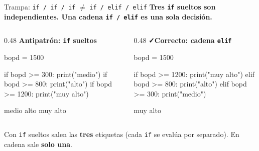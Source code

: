 \documentclass[aspectratio=169, 11pt]{beamer}
\begin{document}
\begin{frame}[fragile,shrink=12]{Trampa: \texttt{if / if / if} \(\neq\) \texttt{if / elif / elif}}
  \vspace{-4pt}
  {\small\color{arcaDark}\bfseries
    Tres \texttt{if} sueltos son \textbf{independientes}. Una cadena \texttt{if / elif} es \textbf{una sola} decisión.}

  \vspace{4pt}
  \begin{columns}[T]
    \begin{column}{0.48\textwidth}
      {\scriptsize\color{arcaRed}\bfseries\faTimes\hspace{3pt}Antipatrón: \texttt{if} sueltos}
      \begin{pyblock}
bopd = 1500

if bopd >= 300:
    print("medio")
if bopd >= 800:
    print("alto")
if bopd >= 1200:
    print("muy alto")
      \end{pyblock}
      \vspace{2pt}
      \begin{outputblock}
medio
alto
muy alto
      \end{outputblock}
    \end{column}

    \begin{column}{0.48\textwidth}
      {\scriptsize\color{codeGreen}\bfseries\faCheck\hspace{3pt}Correcto: cadena \texttt{elif}}
      \begin{pyblock}
bopd = 1500

if bopd >= 1200:
    print("muy alto")
elif bopd >= 800:
    print("alto")
elif bopd >= 300:
    print("medio")
      \end{pyblock}
      \vspace{2pt}
      \begin{outputblock}
muy alto
      \end{outputblock}
    \end{column}
  \end{columns}

  \vspace{3pt}
  {\scriptsize\color{arcaDark}
    \faExclamationTriangle\hspace{3pt}%
    Con \texttt{if} sueltos salen las \textbf{tres} etiquetas (cada \texttt{if} se evalúa por separado).
    En cadena sale \textbf{solo una}.}
\end{frame}
\end{document}
